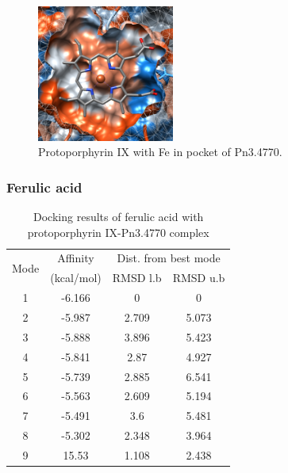 \documentclass[12pt]{article}
\begin{document}
	\FloatBarrier
	
	\FloatBarrier
	\begin{figure}[h!]
		\centering
		\includegraphics[width=0.4\textwidth]{../5/known/Dock/chimera.png}
		\caption{Protoporphyrin IX with Fe in pocket of Pn3.4770.}
		\label{fig5k_5}
	\end{figure}
	\FloatBarrier
	
	\subsubsection{Ferulic acid}
	
	\begin{table}
		\centering
		\caption{Docking results of ferulic acid with protoporphyrin IX-Pn3.4770 complex}
		\label{table5k_2}
		\begin{tabular}{cccc}
			\toprule
			\multirow{2}{*}{Mode} & Affinity & \multicolumn{2}{c}{Dist. from best mode}\\
			&  (kcal/mol) & RMSD l.b & RMSD u.b\\
			\midrule
			1 & -6.166   &       0   &       0\\
			2 & -5.987   &   2.709   &   5.073\\
			3 & -5.888   &   3.896   &   5.423\\
			4 & -5.841   &    2.87   &   4.927\\
			5 & -5.739   &   2.885   &   6.541\\
			6 & -5.563   &   2.609   &   5.194\\
			7 & -5.491   &     3.6   &   5.481\\
			8 & -5.302   &   2.348   &   3.964\\
			9 &  15.53   &   1.108   &   2.438\\
			\bottomrule
			
		\end{tabular}
	\end{table}
	
\end{document}
